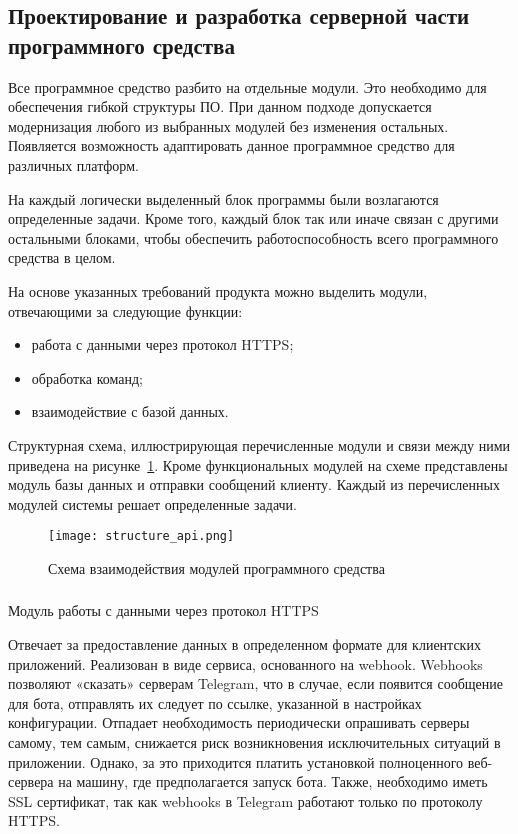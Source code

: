 \subsection{Проектирование и разработка серверной части программного средства}
\label{sec:design:server}

Все программное средство разбито на отдельные модули. Это
необходимо для обеспечения гибкой структуры ПО. При данном подходе
допускается модернизация любого из выбранных модулей без изменения
остальных. Появляется возможность адаптировать данное программное
средство для различных платформ.

На каждый логически выделенный блок программы были возлагаются
определенные задачи. Кроме того, каждый блок так или иначе связан с
другими остальными блоками, чтобы обеспечить работоспособность всего
программного средства в целом.

На основе указанных требований продукта можно выделить модули, отвечающими за следующие функции:

\begin{itemize}
	\item работа с данными через протокол HTTPS;
	\item обработка команд;
	\item взаимодействие с базой данных.
\end{itemize}

Структурная схема, иллюстрирующая перечисленные модули и связи
между ними приведена на рисунке~\ref{fig:design:architecture:structure_api}. Кроме функциональных модулей на
схеме представлены модуль базы данных и отправки сообщений клиенту.
Каждый из перечисленных модулей системы решает определенные задачи.

\begin{figure}[!h]
\centering
	\texttt{[image: structure\_api.png]}
	\caption{Схема взаимодействия модулей программного средства}
	\label{fig:design:architecture:structure_api}
\end{figure}

\subsubsection{} Модуль работы с данными через протокол HTTPS
\label{sec:design:server:api}

Отвечает за предоставление данных в определенном формате для клиентских приложений. Реализован в виде сервиса, основанного на \linebreak webhook. Webhooks позволяют «сказать» серверам Telegram, что в случае, если появится сообщение для бота, отправлять их следует по ссылке, указанной в настройках конфигурации. Отпадает необходимость периодически опрашивать серверы самому, тем самым, снижается риск возникновения исключительных ситуаций в приложении. Однако, за это приходится платить установкой полноценного веб-сервера на машину, где предполагается запуск бота. Также, необходимо иметь SSL сертификат, так как webhooks в Telegram работают только по протоколу HTTPS.

